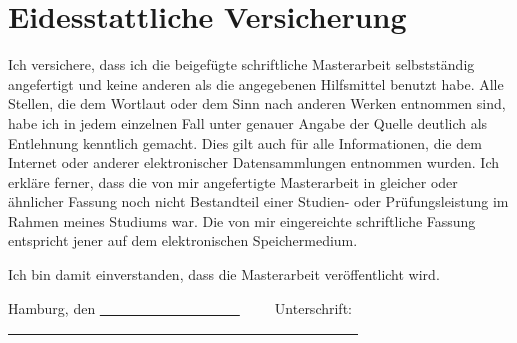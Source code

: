 \chapter*{Eidesstattliche Versicherung}
\thispagestyle{empty}

Ich versichere, dass ich die beigefügte schriftliche Masterarbeit selbstständig angefertigt und keine anderen als die angegebenen Hilfsmittel benutzt habe.
Alle Stellen, die dem Wortlaut oder dem Sinn nach anderen Werken entnommen sind,
habe ich in jedem einzelnen Fall unter genauer Angabe der Quelle deutlich als Entlehnung kenntlich gemacht. Dies gilt auch für alle Informationen, die dem Internet oder
anderer elektronischer Datensammlungen entnommen wurden. Ich erkläre ferner, dass
die von mir angefertigte Masterarbeit in gleicher oder ähnlicher Fassung noch nicht Bestandteil einer Studien- oder Prüfungsleistung im Rahmen meines
Studiums war. Die von mir eingereichte schriftliche Fassung entspricht jener auf dem
elektronischen Speichermedium.

\noindent Ich bin damit einverstanden, dass die Masterarbeit veröffentlicht wird.

\vspace{2cm} 

\noindent Hamburg, den \uline{~~~~~~~~~~~~~~~~~~~~}~~~~~Unterschrift: \uline{~~~~~~~~~~~~~~~~~~~~~~~~~~~~~~~~~~~~~~~~~~~~~~~~~~} 
